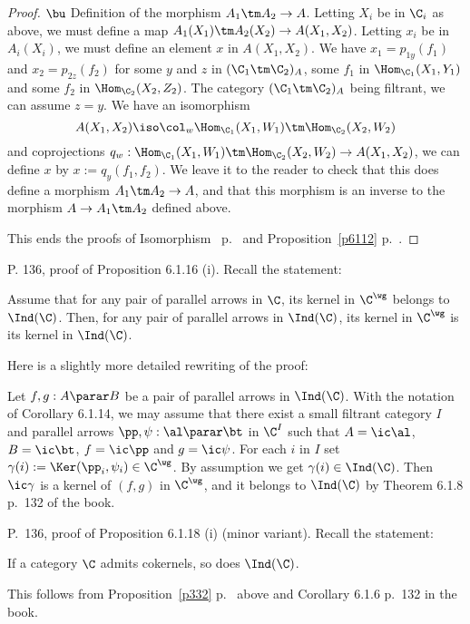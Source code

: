 \documentclass[12pt]{article}
\theoremstyle{remark}
\theoremstyle{definition}
\begin{document}
\begin{proof}
\nn$\bu$ Definition of the morphism $A_1\tm A_2\to A$. Letting $X_i$ be in $\C_i$ as above, we must define a map $A_1(X_1)\tm A_2(X_2)\to A(X_1,X_2)$. Letting $x_i$ be in $A_i(X_i)$, we must define an element $x$ in $A(X_1,X_2)$. We have $x_1=p_{1y}(f_1)$ and $x_2=p_{2z}(f_2)$ for some $y$ and $z$ in $(\C_1\tm\C_2)_A$, some $f_1$ in $\Hom_{\C_1}(X_1,Y_1)$ and some $f_2$ in $\Hom_{\C_2}(X_2,Z_2)$. The category $(\C_1\tm\C_2)_A$ being filtrant, we can assume $z=y$. We have an isomorphism 
$$
A(X_1,X_2)\iso\col_w\Hom_{\C_1}(X_1,W_1)\tm\Hom_{\C_2}(X_2,W_2)
$$ 
and coprojections $q_w:\Hom_{\C_1}(X_1,W_1)\tm\Hom_{\C_2}(X_2,W_2)\to A(X_1,X_2)$, we can define $x$ by $x:=q_y(f_1,f_2)$. We leave it to the reader to check that this does define a morphism $A_1\tm A_2\to A$, and that this morphism is an inverse to the morphism $A\to A_1\tm A_2$ defined above.

This ends the proofs of Isomorphism~ p.~ and Proposition~\ref{p6112} p.~. 
\end{proof} 



\begin{s} 
P. 136, proof of Proposition 6.1.16 (i). Recall the statement:

Assume that for any pair of parallel arrows in $\C$, its kernel in $\C^\wg$ belongs to $\Ind(\C)$. Then, for any pair of parallel arrows in $\Ind(\C)$, its kernel in $\C^\wg$ is its kernel in $\Ind(\C)$.

Here is a slightly more detailed rewriting of the proof:

Let $f,g:A\parar B$ be a pair of parallel arrows in $\Ind(\C)$. With the notation of Corollary 6.1.14, we may assume that there exist a small filtrant category $I$ and parallel arrows $\pp,\psi:\al\parar\bt$ in $\C^I$ such that $A=\ic\al$, $B=\ic\bt$, $f=\ic\pp$ and $g=\ic\psi$. For each $i$ in $I$ set $\gamma(i):=\Ker(\pp_i,\psi_i)\in\C^\wg$. By assumption we get $\gamma(i)\in\Ind(\C)$. Then $\ic\gamma$ is a kernel of $(f,g)$ in $\C^\wg$, and it belongs to $\Ind(\C)$ by Theorem 6.1.8 p.~132 of the book.
\end{s}

%

\begin{s} 
P.~136, proof of Proposition 6.1.18 (i) (minor variant). Recall the statement: \begin{prop}[Proposition 6.1.18 (i) p.~136] 
If a category $\C$ admits cokernels, so does $\Ind(\C)$. 
\end{prop} 
This follows from Proposition~\ref{p332} p.~ above and Corollary 6.1.6 p.~132 in the book. 
\end{s}
\end{document}
